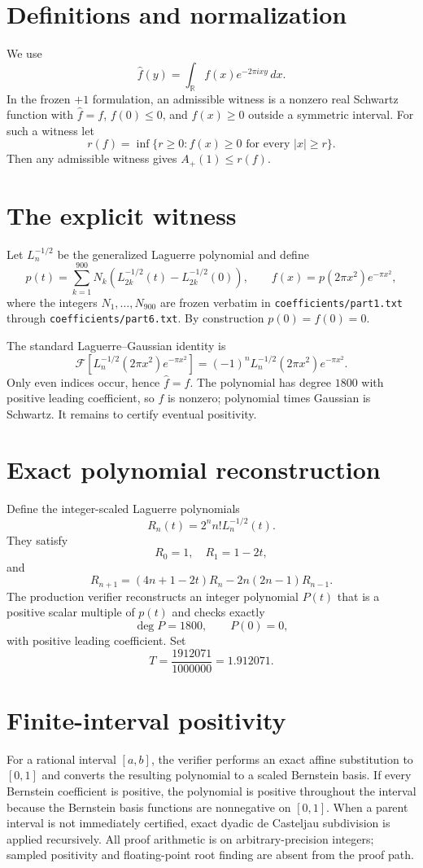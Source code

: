\documentclass[11pt]{article}
\newcommand{\R}{\mathbb R}
\newcommand{\F}{\mathcal F}
\begin{document}
\section{Definitions and normalization}
We use
\[
\widehat f(y)=\int_{\R} f(x)e^{-2\pi ixy}\,dx.
\]
In the frozen $+1$ formulation, an admissible witness is a nonzero real Schwartz function with $\widehat f=f$, $f(0)\leq0$, and $f(x)\geq0$ outside a symmetric interval.
For such a witness let
\[
r(f)=\inf\{r\geq0:f(x)\geq0\text{ for every }|x|\geq r\}.
\]
Then any admissible witness gives $A_+(1)\leq r(f)$.

\section{The explicit witness}
Let $L_n^{-1/2}$ be the generalized Laguerre polynomial and define
\[
p(t)=\sum_{k=1}^{900}N_k\left(L_{2k}^{-1/2}(t)-L_{2k}^{-1/2}(0)\right),
\qquad
f(x)=p(2\pi x^2)e^{-\pi x^2},
\]
where the integers $N_1,\dots,N_{900}$ are frozen verbatim in
\texttt{coefficients/part1.txt} through \texttt{coefficients/part6.txt}.
By construction $p(0)=f(0)=0$.

The standard Laguerre--Gaussian identity is
\[
\F\!\left[L_n^{-1/2}(2\pi x^2)e^{-\pi x^2}\right]
=(-1)^nL_n^{-1/2}(2\pi x^2)e^{-\pi x^2}.
\]
Only even indices occur, hence $\widehat f=f$.
The polynomial has degree $1800$ with positive leading coefficient, so $f$ is nonzero; polynomial times Gaussian is Schwartz.
It remains to certify eventual positivity.

\section{Exact polynomial reconstruction}
Define the integer-scaled Laguerre polynomials
\[
R_n(t)=2^n n!L_n^{-1/2}(t).
\]
They satisfy
\[
R_0=1,\quad R_1=1-2t,
\]
and
\[
R_{n+1}=(4n+1-2t)R_n-2n(2n-1)R_{n-1}.
\]
The production verifier reconstructs an integer polynomial $P(t)$ that is a positive scalar multiple of $p(t)$ and checks exactly
\[
\deg P=1800,\qquad P(0)=0,
\]
with positive leading coefficient.
Set
\[
T=\frac{1912071}{1000000}=1.912071.
\]

\section{Finite-interval positivity}
For a rational interval $[a,b]$, the verifier performs an exact affine substitution to $[0,1]$ and converts the resulting polynomial to a scaled Bernstein basis.
If every Bernstein coefficient is positive, the polynomial is positive throughout the interval because the Bernstein basis functions are nonnegative on $[0,1]$.
When a parent interval is not immediately certified, exact dyadic de Casteljau subdivision is applied recursively.
All proof arithmetic is on arbitrary-precision integers; sampled positivity and floating-point root finding are absent from the proof path.
\end{document}
